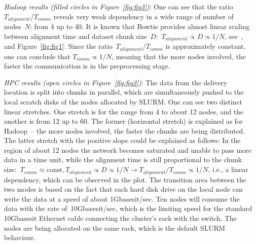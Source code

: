 \documentclass[10pt]{article}
\newcommand{\COMMENT}[1]{{\color{red} #1 }}
\begin{document}

\textit{Hadoop results (filled circles in Figure~\ref{fig:fig3})}: One can see that the ratio~$T_{alignment}/T_{comm}$ reveals very weak dependency in a wide range of number of nodes~$N$: from 4 up to 40. It is known that Bowtie provides almost linear scaling between alignment time and dataset chunk size~$D$:~$T_{alignment}\propto  D\propto 1/N$, see~\cite{Langmead:2009uq}, and Figure~\ref{fig:fig1}. Since the ratio~$T_{alignment}/T_{comm}$ is approximately constant, one can conclude that $T_{comm}\propto 1/N$, meaning that the more nodes involved, the faster the communication is in the preprocessing stage.

\textit{HPC results (open circles in Figure~\ref{fig:fig3})}: The data from the delivery location is split into chunks in parallel, which are simultaneously pushed to the local scratch disks of the nodes allocated by SLURM. One can see two distinct linear stretches. One stretch is for the range from 4 to about 12 nodes, and the another is from 12 up to 60. The former (horizontal stretch) is explained as for Hadoop~-- the more nodes involved, the faster the chunks are being distributed. The latter stretch with the positive slope could be explained as follows: In the region of about 12 nodes the network becomes saturated
and unable to pass more data in a time unit, while the alignment time is still proportional to the chunk size:~$T_{comm}\approx\mbox{const}, T_{alignment}\propto D\propto 1/N \rightarrow T_{alignment}/T_{comm}\propto 1/N$, i.e., a linear dependency, which can be observed in the plot. 
The transition area between the two modes is based on the fact that each hard disk drive on the local node can write the data at a speed of about 1Gbasesit/sec. Ten nodes will consume the data with the rate of~10Gbasesit/sec, which is the limiting speed for the standard 10Gbasesit Ethernet cable connecting the cluster's rack with the switch. The nodes are being allocated on the same rack, which is the default SLURM behaviour.
\end{document}
